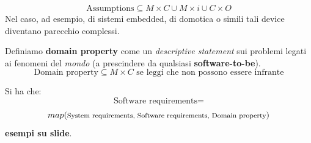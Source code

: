 \documentclass[a4paper,12pt, oneside]{book}
\begin{document}
\[\mbox{Assumptions}\subseteq M\times C\cup M\times i\cup C\times O\]
Nel caso, ad esempio, di sistemi embedded, di domotica o simili tali device
diventano parecchio complessi.\\
\begin{definizione}
  Definiamo \textbf{domain property} come un \textit{descriptive statement} sui
  problemi legati ai fenomeni del \textit{mondo} (a prescindere da qualsiasi
  \textbf{software-to-be}).\\
  \[\mbox{Domain property}\subseteq M\times C \mbox{ se leggi che non possono
      essere infrante}\]
\end{definizione}
Si ha che:
\[\mbox{Software requirements}= \]
\[\footnotesize{map}(\mbox{\footnotesize{System requirements, Software
      requirements,  Domain property}})\]
\textbf{esempi su slide}.\\
\end{document}
